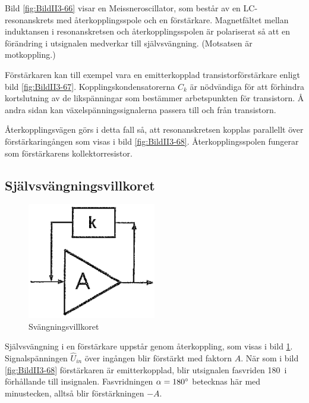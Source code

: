 Bild \ref{fig:BildII3-66} visar en Meissneroscillator, som består av en
LC-resonanskrets med återkopplingsspole och en förstärkare.
Magnetfältet mellan induktansen i resonanskretsen och återkopplingsspolen är
polariserat så att en förändring i utsignalen medverkar till självsvängning.
(Motsatsen är motkoppling.)

Förstärkaren kan till exempel vara en emitterkopplad transistorförstärkare enligt bild
\ref{fig:BildII3-67}.
Kopplingskondensatorerna \(C_k\) är nödvändiga för att förhindra kortslutning
av de likspänningar som bestämmer arbetspunkten för transistorn.
Å andra sidan kan växelspänningssignalerna passera till och från transistorn.

Återkopplingsvägen görs i detta fall så, att resonanskretsen kopplas
parallellt över förstärkaringången som visas i bild \ref{fig:BildII3-68}.
Återkopplingsspolen fungerar som förstärkarens kollektorresistor.

\subsection{Självsvängningsvillkoret}

\begin{figure}
\includegraphics[width=0.5\textwidth]{images/cropped_pdfs/bild_2_3-69.pdf}
\caption{Svängningsvillkoret}
\label{fig:BildII3-69}
\end{figure}

Självsvängning i en förstärkare uppstår genom återkoppling, som visas i
bild \ref{fig:BildII3-69}.
Signalspänningen \(\hat{U}_{in}\) över ingången blir förstärkt med
faktorn \(A\).
När som i bild \ref{fig:BildII3-68} förstärkaren är emitterkopplad, blir
utsignalen fasvriden 180\degree~i förhållande till insignalen.
Fasvridningen \(\alpha=180\degree\) betecknas här med minustecken, alltså blir
förstärkningen \(-A\).

